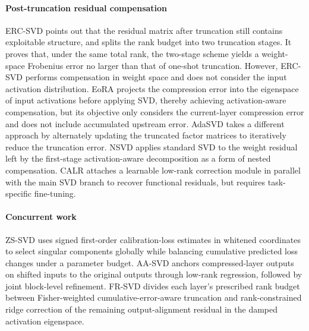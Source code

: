 \paragraph{Post-truncation residual compensation}
ERC-SVD \citep{bai2025ercsvd} points out that the residual matrix after truncation still contains exploitable structure, and splits the rank budget into two truncation stages. It proves that, under the same total rank, the two-stage scheme yields a weight-space Frobenius error no larger than that of one-shot truncation. However, ERC-SVD performs compensation in weight space and does not consider the input activation distribution. EoRA \citep{liu2025eora} projects the compression error into the eigenspace of input activations before applying SVD, thereby achieving activation-aware compensation, but its objective only considers the current-layer compression error and does not include accumulated upstream error. AdaSVD \citep{li2025adasvd} takes a different approach by alternately updating the truncated factor matrices to iteratively reduce the truncation error. NSVD \citep{lu2025nsvd} applies standard SVD to the weight residual left by the first-stage activation-aware decomposition as a form of nested compensation. CALR \citep{kautsar2025calr} attaches a learnable low-rank correction module in parallel with the main SVD branch to recover functional residuals, but requires task-specific fine-tuning.

\paragraph{Concurrent work}
ZS-SVD \citep{abbasi2026zssvd} uses signed first-order calibration-loss estimates in whitened coordinates to select singular components globally while balancing cumulative predicted loss changes under a parameter budget. AA-SVD \citep{sinha2026aasvd} anchors compressed-layer outputs on shifted inputs to the original outputs through low-rank regression, followed by joint block-level refinement. FR-SVD divides each layer's prescribed rank budget between Fisher-weighted cumulative-error-aware truncation and rank-constrained ridge correction of the remaining output-alignment residual in the damped activation eigenspace.

